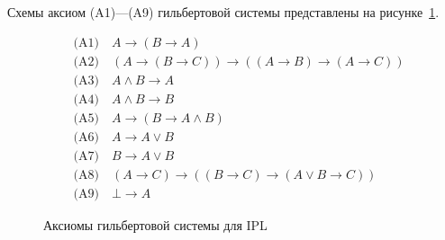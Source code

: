 \documentclass[14pt, russian]{scrartcl}
\begin{document}
Схемы аксиом (A1)---(A9) гильбертовой системы представлены на рисунке~\ref{fig:hilbert-axioms-app}.

\begin{figure}[!htb]
\centering
\begin{align*}
&\text{(A1)} \quad A \rightarrow (B \rightarrow A) \\
&\text{(A2)} \quad (A \rightarrow (B \rightarrow C)) \rightarrow ((A \rightarrow B) \rightarrow (A \rightarrow C)) \\
&\text{(A3)} \quad A \land B \rightarrow A \\
&\text{(A4)} \quad A \land B \rightarrow B \\
&\text{(A5)} \quad A \rightarrow (B \rightarrow A \land B) \\
&\text{(A6)} \quad A \rightarrow A \lor B \\
&\text{(A7)} \quad B \rightarrow A \lor B \\
&\text{(A8)} \quad (A \rightarrow C) \rightarrow ((B \rightarrow C) \rightarrow (A \lor B \rightarrow C)) \\
&\text{(A9)} \quad \bot \rightarrow A
\end{align*}
\caption{Аксиомы гильбертовой системы для IPL}
\label{fig:hilbert-axioms-app}
\end{figure}
\end{document}
